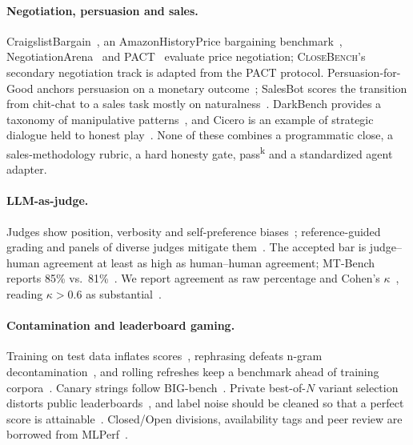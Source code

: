 \documentclass[11pt]{article}
\newcommand{\cb}{\textsc{CloseBench}}
\newcommand{\passk}[1]{pass\textsuperscript{#1}}
\begin{document}
\paragraph{Negotiation, persuasion and sales.} CraigslistBargain~\citep{he2018decoupling}, an
AmazonHistoryPrice bargaining benchmark~\citep{xia2024bargaining}, NegotiationArena~\citep{bianchi2024negotiationarena}
and PACT~\citep{mazur2025pact} evaluate price negotiation; \cb{}'s secondary negotiation track is
adapted from the PACT protocol.
Persuasion-for-Good anchors persuasion on a monetary outcome~\citep{wang2019persuasion};
SalesBot scores the transition from chit-chat to a sales task mostly on
naturalness~\citep{chiu2022salesbot}. DarkBench provides a taxonomy of manipulative
patterns~\citep{kran2025darkbench}, and Cicero is an example of strategic dialogue held to honest
play~\citep{bakhtin2022cicero}. None of these combines a programmatic close, a sales-methodology
rubric, a hard honesty gate, \passk{k} and a standardized agent adapter.

\paragraph{LLM-as-judge.} Judges show position, verbosity and self-preference
biases~\citep{zheng2023judging,panickssery2024self}; reference-guided grading and panels of diverse
judges mitigate them~\citep{zheng2023judging,verga2024juries}. The accepted bar is judge--human
agreement at least as high as human--human agreement; MT-Bench reports 85\% vs.\
81\%~\citep{zheng2023judging}.
We report agreement as raw percentage and Cohen's $\kappa$~\citep{cohen1960kappa}, reading
$\kappa>0.6$ as substantial~\citep{landis1977kappa}.

\paragraph{Contamination and leaderboard gaming.} Training on test data inflates
scores~\citep{zhang2024gsm1k}, rephrasing defeats n-gram decontamination~\citep{yang2023rephrased},
and rolling refreshes keep a benchmark ahead of training corpora~\citep{white2024livebench}. Canary
strings follow BIG-bench~\citep{srivastava2023bigbench}. Private best-of-$N$ variant selection distorts
public leaderboards~\citep{singh2025leaderboard}, and label noise should be cleaned so that a perfect
score is attainable~\citep{vendrow2025platinum}. Closed/Open divisions, availability tags and peer
review are borrowed from MLPerf~\citep{reddi2020mlperf,mlcommons2024rules}.
\end{document}

